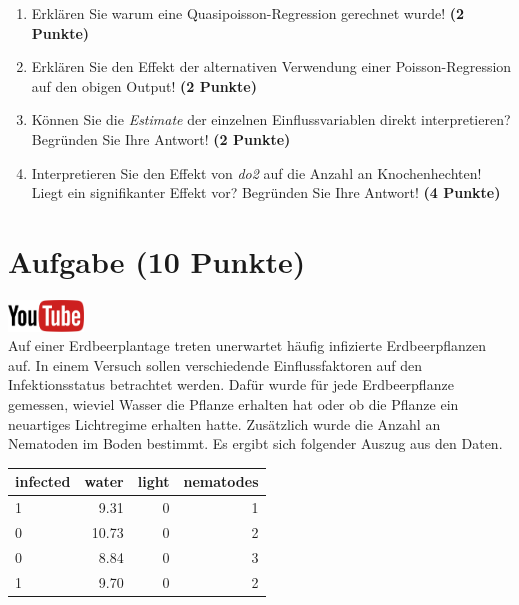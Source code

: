 \documentclass[a4paper, 10pt]{scrartcl}\usepackage[]{graphicx}\usepackage[]{xcolor}
\newenvironment{knitrout}{}{} %
\begin{document}
\begin{enumerate}
\item Erkl{\"a}ren Sie warum eine Quasipoisson-Regression gerechnet wurde! \textbf{(2 Punkte)}
\item Erkl{\"a}ren Sie den Effekt der alternativen Verwendung einer Poisson-Regression auf
  den obigen \Rlogo Output!  \textbf{(2 Punkte)}
\item K{\"o}nnen Sie die \textit{Estimate} der einzelnen Einflussvariablen
  direkt interpretieren? Begr{\"u}nden Sie Ihre Antwort! \textbf{(2 Punkte)}
\item Interpretieren Sie den Effekt von \textit{do2} auf die Anzahl an Knochenhechten! Liegt ein
  signifikanter Effekt vor? Begr{\"u}nden Sie Ihre Antwort! \textbf{(4 Punkte)}
\end{enumerate}
 
\clearpage

\section{Aufgabe \hfill (10 Punkte)}


\hfill\href{https://youtu.be/PVUK0zdkZkk}{\includegraphics[width =
  2cm]{img/youtube}}\\[1Ex]




Auf einer Erdbeerplantage treten unerwartet h{\"a}ufig infizierte
Erdbeerpflanzen auf. In einem Versuch sollen verschiedende Einflussfaktoren
auf den Infektionsstatus betrachtet werden. Daf{\"u}r wurde f{\"u}r jede
Erdbeerpflanze gemessen, wieviel Wasser die Pflanze erhalten hat oder ob
die Pflanze ein neuartiges Lichtregime erhalten hatte. Zus{\"a}tzlich wurde die
Anzahl an Nematoden im Boden bestimmt. Es ergibt sich folgender Auszug aus
den Daten.

\begin{knitrout}
\color{fgcolor}\begin{table}[!h]
\centering
\begin{tabular}{lrrr}
\toprule
infected & water & light & nematodes\\
\midrule
1 & 9.31 & 0 & 1\\
0 & 10.73 & 0 & 2\\
0 & 8.84 & 0 & 3\\
1 & 9.70 & 0 & 2\\
\bottomrule
\end{tabular}
\end{table}

\end{knitrout}
\end{document}

